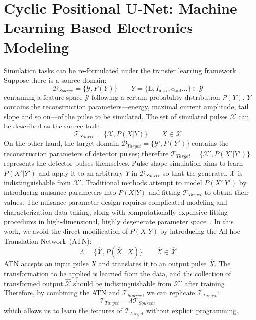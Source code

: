 \section{Cyclic Positional U-Net: Machine Learning Based Electronics Modeling}
Simulation tasks can be re-formulated under the transfer learning framework. Suppose there is a source domain:
\begin{equation}
    \mathcal{D}_{Source}=\{\mathcal{Y},P(Y)\}\qquad Y=\{\mathrm{E},I_{\mathrm{max}},c_{\mathrm{tail}}...\}\in \mathcal{Y}
    \label{eqn:source_domain}
\end{equation}
containing a feature space $\mathcal{Y}$ following a certain probability distribution $P(Y)$. $Y$ contains the reconstruction parameters---energy, maximal current amplitude, tail slope and so on---of the pulse to be simulated. The set of simulated pulses $\mathcal{X}$ can be described as the source task:
\begin{equation}
    \mathcal{T}_{Source}=\{\mathcal{X},P(X|Y)\} \qquad X\in \mathcal{X}
    \label{eqn:source_task}
\end{equation}
On the other hand, the target domain $\mathcal{D}_{Target}=\{\mathcal{Y}',P(Y')\}$ contains the reconstruction parameters of detector pulses; therefore $\mathcal{T}_{Target}=\{\mathcal{X}',P(X'|Y')\}$ represents the detector pulses themselves. Pulse shape simulation aims to learn $P(X'|Y')$ and apply it to an arbitrary $Y$ in $\mathcal{D}_{Source}$ so that the generated $\mathcal{X}$ is indistinguishable from $\mathcal{X}'$. Traditional methods attempt to model $P(X'|Y')$ by introducing nuisance parameters into $P(X|Y)$ and fitting $\mathcal{T}_{Target}$ to obtain their values. The nuisance parameter design requires complicated modeling and characterization data-taking, along with computationally expensive fitting procedures in high-dimensional, highly degenerate parameter space~\cite{Ben_Thesis,Sam_Thesis}. In this work, we avoid the direct modification of  $P(X|Y)$ by introducing the Ad-hoc Translation Network~(ATN):
\begin{equation}
\Lambda = \{\hat{\mathcal{X}}, P(\hat{X}\mid X)\}\qquad \hat{X}\in \hat{\mathcal{X}}
\label{eqn:atn}
\end{equation}
ATN accepts an input pulse $X$ and translates it to an output pulse $\hat{X}$. The transformation to be applied is learned from the data, and the collection of transformed output $\hat{\mathcal{X}}$ should be indistinguishable from $\mathcal{X}'$ after training. Therefore, by combining the ATN and $\mathcal{T}_{Source}$, we can replicate $\mathcal{T}_{Target}$:
\begin{equation}
    \mathcal{T}_{Target}=\Lambda \mathcal{T}_{Source} ,
    \label{eqn:atn_task}
\end{equation}
which allows us to learn the features of $\mathcal{T}_{Target}$ without explicit programming.


